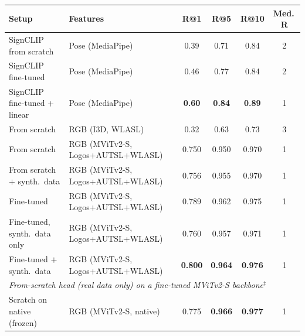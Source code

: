 \begin{table}[t]
\centering
\footnotesize
\setlength{\tabcolsep}{3pt}
\begin{tabular}{llcccc}
\toprule
\textbf{Setup} & \textbf{Features} & \textbf{R@1} & \textbf{R@5} & \textbf{R@10} & \textbf{Med.\,R} \\
\midrule
SignCLIP from scratch        & Pose (MediaPipe) & 0.39 & 0.71 & 0.84 & 2 \\
SignCLIP fine-tuned          & Pose (MediaPipe) & 0.46 & 0.77 & 0.84 & 2 \\
SignCLIP fine-tuned + linear & Pose (MediaPipe) & \textbf{0.60} & \textbf{0.84} & \textbf{0.89} & 1 \\
\midrule
From scratch          & RGB (I3D, WLASL)                  & 0.32  & 0.63  & 0.73  & 3 \\
From scratch          & RGB (MViTv2-S, Logos+AUTSL+WLASL) & 0.750 & 0.950 & 0.970 & 1 \\
From scratch $+$ synth.\ data & RGB (MViTv2-S, Logos+AUTSL+WLASL) & 0.756 & 0.955 & 0.970 & 1 \\
Fine-tuned            & RGB (MViTv2-S, Logos+AUTSL+WLASL) & 0.789 & 0.962 & 0.975 & 1 \\
Fine-tuned, synth.\ data only & RGB (MViTv2-S, Logos+AUTSL+WLASL) & 0.760 & 0.957 & 0.971 & 1 \\
Fine-tuned $+$ synth.\ data & RGB (MViTv2-S, Logos+AUTSL+WLASL) & \textbf{0.800} & \textbf{0.964} & \textbf{0.976} & 1 \\
\midrule
\multicolumn{6}{l}{\textit{From-scratch head (real data only) on a \emph{fine-tuned} MViTv2-S backbone}$^{\ddagger}$} \\
Scratch on native (frozen) & RGB (MViTv2-S, native)   & 0.775 & \textbf{0.966} & \textbf{0.977} & 1 \\

\end{tabular}
\end{table}
